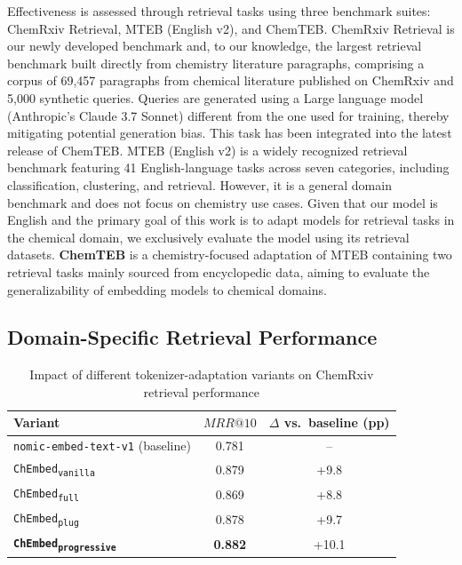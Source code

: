 \documentclass[twoside,twocolumn,9pt]{article}
\begin{document}
Effectiveness is assessed through retrieval tasks using three benchmark suites: ChemRxiv Retrieval, MTEB (English v2), and ChemTEB. {ChemRxiv Retrieval} is our newly developed benchmark and, to our knowledge, the largest retrieval benchmark built directly from chemistry literature paragraphs, comprising a corpus of 69,457 paragraphs from chemical literature published on ChemRxiv and 5,000 synthetic queries. Queries are generated using a Large language model (Anthropic's Claude 3.7 Sonnet) different from the one used for training, thereby mitigating potential generation bias. This task has been integrated into the latest release of ChemTEB. {MTEB (English v2)} \cite{muennighoff2022mteb} is a widely recognized retrieval benchmark featuring 41 English-language tasks across seven categories, including classification, clustering, and retrieval. However, it is a general domain benchmark and does not focus on chemistry use cases. Given that our model is English and the primary goal of this work is to adapt models for retrieval tasks in the chemical domain, we exclusively evaluate the model using its retrieval datasets. \textbf{ChemTEB} \cite{pmlr-v262-shiraee-kasmaee24a} is a chemistry-focused adaptation of MTEB containing two retrieval tasks mainly sourced from encyclopedic data, aiming to evaluate the generalizability of embedding models to chemical domains.

\subsection{Domain-Specific Retrieval Performance}
\begin{table}[!b]
    \centering
    \caption{Impact of different tokenizer-adaptation variants on ChemRxiv retrieval performance}
    \label{tab:tok-ablation}
    \begin{tabular}{lcc}
    \toprule
    \textbf{Variant} & $MRR@10$ & $\Delta$ vs.\ baseline (pp) \\
    \midrule
    \texttt{nomic-embed-text-v1} (baseline)       & 0.781 & --    \\
    \texttt{ChEmbed\textsubscript{vanilla}}       & 0.879 & +9.8  \\
    \texttt{ChEmbed\textsubscript{full}}          & 0.869 & +8.8  \\
    \texttt{ChEmbed\textsubscript{plug}}          & 0.878 & +9.7  \\
    \textbf{\texttt{ChEmbed\textsubscript{progressive}}} & \textbf{0.882} & +10.1 \\
    \bottomrule
    \end{tabular}
\end{table}
\end{document}

